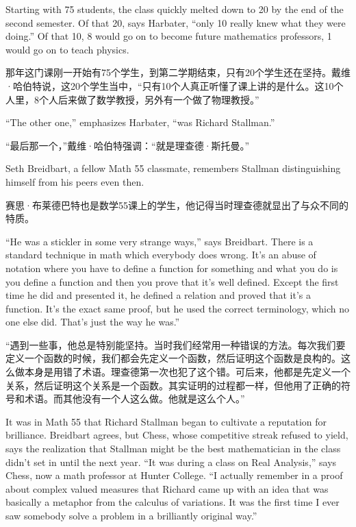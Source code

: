 \ifdefined\eng
Starting with 75 students, the class quickly melted down to 20 by the end of the second semester. Of that 20, says Harbater, ``only 10 really knew what they were doing.'' Of that 10, 8 would go on to become future mathematics professors, 1 would go on to teach physics.
\fi

\ifdefined\chs
那年这门课刚一开始有75个学生，到第二学期结束，只有20个学生还在坚持。戴维·哈伯特说，这20个学生当中，“只有10个人真正听懂了课上讲的是什么。这10个人里，8个人后来做了数学教授，另外有一个做了物理教授。”
\fi

\ifdefined\eng
``The other one,'' emphasizes Harbater, ``was Richard Stallman.''
\fi

\ifdefined\chs
“最后那一个，”戴维·哈伯特强调：“就是理查德·斯托曼。”
\fi

\ifdefined\eng
Seth Breidbart, a fellow Math 55 classmate, remembers Stallman distinguishing himself from his peers even then.
\fi

\ifdefined\chs
赛思·布莱德巴特也是数学55课上的学生，他记得当时理查德就显出了与众不同的特质。
\fi

\ifdefined\eng
``He was a stickler in some very strange ways,'' says Breidbart. There is a standard technique in math which everybody does wrong. It's an abuse of notation where you have to define a function for something and what you do is you define a function and then you prove that it's well defined. Except the first time he did and presented it, he defined a relation and proved that it's a function. It's the exact same proof, but he used the correct terminology, which no one else did. That's just the way he was.''
\fi

\ifdefined\chs
“遇到一些事，他总是特别能坚持。当时我们经常用一种错误的方法。每次我们要定义一个函数的时候，我们都会先定义一个函数，然后证明这个函数是良构的。这么做本身是用错了术语。理查德第一次也犯了这个错。可后来，他都是先定义一个关系，然后证明这个关系是一个函数。其实证明的过程都一样，但他用了正确的符号和术语。而其他没有一个人这么做。他就是这么个人。”
\fi

\ifdefined\eng
It was in Math 55 that Richard Stallman began to cultivate a reputation for brilliance. Breidbart agrees, but Chess, whose competitive streak refused to yield, says the realization that Stallman might be the best mathematician in the class didn't set in until the next year. ``It was during a class on Real Analysis,'' says Chess, now a math professor at Hunter College. ``I actually remember in a proof about complex valued measures that Richard came up with an idea that was basically a metaphor from the calculus of variations. It was the first time I ever saw somebody solve a problem in a brilliantly original way.''
\fi

